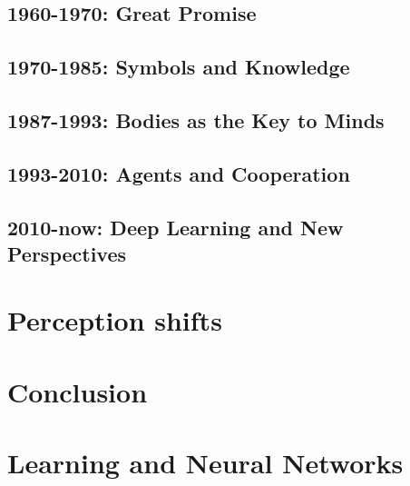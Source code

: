 \documentclass[oneside,notitlepage]{report}
\begin{document}
\section{1960-1970: Great Promise}


\section{1970-1985: Symbols and Knowledge}


\section{1987-1993: Bodies as the Key to Minds}


\section{1993-2010: Agents and Cooperation}


\section{2010-now: Deep Learning and New Perspectives}


\chapter{Perception shifts}




\chapter{Conclusion}

\appendix
\chapter{Learning and Neural Networks}


\printbibliography
\end{document}

